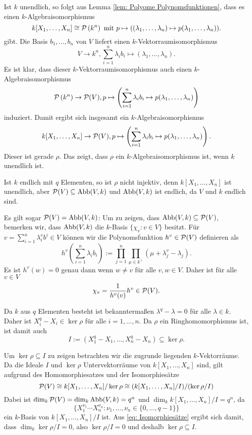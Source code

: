\documentclass[a4paper,10pt]{article}
\begin{document}
Ist $k$ unendlich, so folgt aus Lemma \ref{lem: Polyome Polynomsfunktionen}, dass es einen $k$-Algebraisomorphismus
\[
 k[X_1, \ldots, X_n] \cong \mathcal{P}\left(k^n\right) \text{ mit }
 p \mapsto ((\lambda_1, \ldots, \lambda_n) \mapsto p(\lambda_1, \ldots, \lambda_n)).
\]
gibt. Die Basis $b_1, \ldots, b_n$ von $V$ liefert einen $k$-Vektorraumisomorphismus
\[
 V \to k^n, \sum_{i=1}^n \lambda_i b_i \mapsto (\lambda_1, \ldots, \lambda_n).
\]
Es ist klar, dass dieser $k$-Vektorraumisomorphismus auch einen $k$-Algebra\-iso\-mor\-phismus
\[
 \mathcal{P}\left(k^n\right) \to \mathcal{P}(V), p \mapsto \left(\sum_{i=1}^n \lambda_i b_i \mapsto p(\lambda_1, \ldots, \lambda_n)\right)
\]
induziert. Damit ergibt sich insgesamt ein $k$-Algebraisomorphismus
\[
 k[X_1, \ldots, X_n] \to \mathcal{P}(V), p \mapsto \left( \sum_{i=1}^n \lambda_i b_i \mapsto p(\lambda_1, \ldots, \lambda_n) \right).
\]
Dieser ist gerade $\rho$. Das zeigt, dass $\rho$ ein $k$-Algebraisomorphismus ist, wenn $k$ unendlich ist.

Ist $k$ endlich mit $q$ Elementen, so ist $\rho$ nicht injektiv, denn $k[X_1, \ldots, X_n]$ ist unendlich, aber $\mathcal{P}(V) \subseteq \operatorname{Abb}(V,k)$ und $\operatorname{Abb}(V,k)$ ist endlich, da $V$ und $k$ endlich sind.

Es gilt sogar $\mathcal{P}(V) = \operatorname{Abb}(V,k)$: Um zu zeigen, dass $\operatorname{Abb}(V,k) \subseteq \mathcal{P}(V)$, bemerken wir, dass $\operatorname{Abb}(V,k)$ die $k$-Basis $\{\chi_v : v \in V\}$ besitzt. Für $v = \sum_{i=1}^n \lambda^v_i b^i \in V$ können wir die Polynomsfunktion $h^v \in \mathcal{P}(V)$ definieren als
\[
 h^v\left(\sum_{i=1}^n \lambda_i b_i\right) := \prod_{j=1}^n \prod_{\mu \in k^\times} (\mu +  \lambda^v_j - \lambda_j).
\]
Es ist $h^v(w) = 0$ genau dann wenn $w \neq v$ für alle $v, w \in V$. Daher ist für alle $v \in V$
\[
 \chi_v = \frac{1}{h^v(v)} h^v \in \mathcal{P}(V).
\]

Da $k$ aus $q$ Elementen besteht ist bekanntermaßen $\lambda^q-\lambda = 0$ für alle $\lambda \in k$. Daher ist $X_i^q-X_i \in \ker \rho$ für alle $i=1,\ldots,n$. Da $\rho$ ein Ringhomomorphismus ist, ist damit auch
\[
 I:= (X_1^q-X_1, \ldots, X_n^q-X_n) \subseteq \ker \rho.
\]

Um $\ker \rho \subseteq I$ zu zeigen betrachten wir die zugrunde liegenden $k$-Vektorräume. Da die Ideale $I$ und $\ker \rho$ Untervektorräume von $k[X_1, \ldots, X_n]$ sind, gilt aufgrund des Homomorphiesatzes und der Isomorphiesätze
\begin{equation}\label{eq: Isomorphiesätze}
 \mathcal{P}(V) \cong k[X_1, \ldots, X_n] / \ker \rho \cong (k[X_1, \ldots, X_n] / I)/(\ker \rho / I)
\end{equation}
Dabei ist $\dim_k \mathcal{P}(V) = \dim_k \operatorname{Abb}(V,k) = q^n$ und $\dim_k k[X_1, \ldots, X_n] / I = q^n$, da
\[
 \{X_1^{\nu_1} \cdots X_n^{\nu_n} : \nu_1, \ldots, \nu_n \in \{0,\ldots,q-1\}\}
\]
ein $k$-Basis von $k[X_1, \ldots, X_n] / I$ ist. Aus \eqref{eq: Isomorphiesätze} ergibt sich damit, dass $\dim_k \ker \rho/I = 0$, also $\ker \rho/I = 0$ und deshalb $\ker \rho \subseteq I$.
\end{document}
